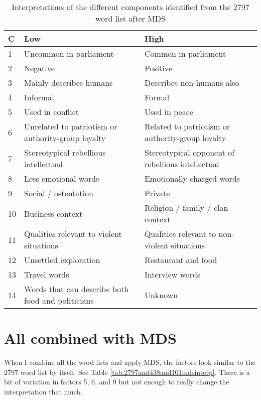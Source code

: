 \documentclass[eric_thesis.tex]{subfiles}
\begin{document}
\begin{table}[tbp]
\begin{tabular}{ | l |p{2in}|p{2in}|}
 \hline
 C & Low & High \\
 \hline
 1 & Uncommon in parliament & Common in parliament\\
 2 & Negative & Positive\\
 3 & Mainly describes humans & Describes non-humans also \\
 4 & Informal & Formal \\
 5 & Used in conflict & Used in peace \\
 6 & Unrelated to patriotism or authority-group loyalty & Related to 
     patriotism or authority-group loyalty \\
 7 & Stereotypical rebellious intellectual & Stereotypical opponent of 
     rebellious intellectual \\
 8 & Less emotional words & Emotionally charged words \\
 9 & Social / ostentation & Private  \\
 10 & Business context & Religion / family / clan context \\
 11 & Qualities relevant to violent situations & Qualities relevant to 
       non-violent situations \\
 12 & Unsettled exploration & Restaurant and food \\
 13 & Travel words & Interview words \\
 14 & Words that can describe both food and politicians &  Unknown \\
 \hline
\end{tabular}
 \caption{Interpretations of the different components identified from the 2797
 word list after MDS}
 \label{tab:2797mdsinterp}
\end{table}

\section{All combined with MDS}

When I combine all the word lists and apply MDS, the factors look similar to 
the 2797 word list by itself. See Table \ref{tab:2797and438and101mdsinterp}. 
There is a bit of variation in factors 5, 6, and 9 but not enough to really 
change the interpretation that much.
\end{document}
